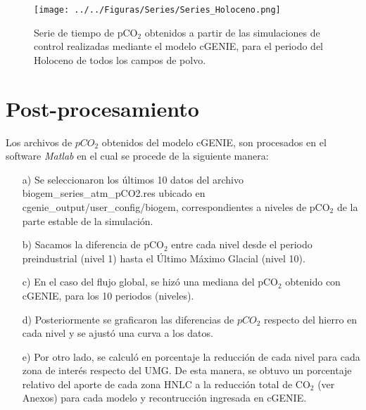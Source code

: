 \begin{figure}[H]
\centering
 \texttt{[image: ../../Figuras/Series/Series\_Holoceno.png]}
 \caption[Series de pCO$_2$ de simulación de control]{Serie de tiempo de pCO$_2$ obtenidos a partir de las simulaciones de control realizadas mediante el modelo cGENIE, para el periodo del Holoceno de todos los campos de polvo.}
  \label{fig:Control}
\end{figure}

\section{Post-procesamiento}

Los archivos de $pCO_2$ obtenidos del modelo cGENIE, son procesados en el software \textit{Matlab} en el cual se procede de la siguiente manera: 

\begin{itemize}
    \item[a) ] Se seleccionaron los últimos 10 datos del archivo biogem\_series\_atm\_pCO2.res ubicado en cgenie\_output/user\_config/biogem, correspondientes a niveles de pCO$_2$ de la parte estable de la simulación. 
    \item[b) ] Sacamos la diferencia de pCO$_2$ entre cada nivel desde el periodo preindustrial (nivel 1) hasta el \'Ultimo M\'aximo Glacial (nivel 10).
    \item[c) ] En el caso del flujo global, se hiz\'o una mediana del pCO$_2$ obtenido con cGENIE, para los 10 periodos (niveles).
    \item[d) ] Posteriormente se graficaron las diferencias de $pCO_2$ respecto del hierro en cada nivel y se ajust\'o una curva a los datos.
    \item[e) ] Por otro lado, se calculó en porcentaje la reducción de cada nivel para cada zona
de interés respecto del UMG. De esta manera, se obtuvo un porcentaje relativo del aporte de cada zona HNLC a la reducción total de CO$_2$ (ver Anexos) para cada modelo y recontrucción ingresada en cGENIE.
\end{itemize}



